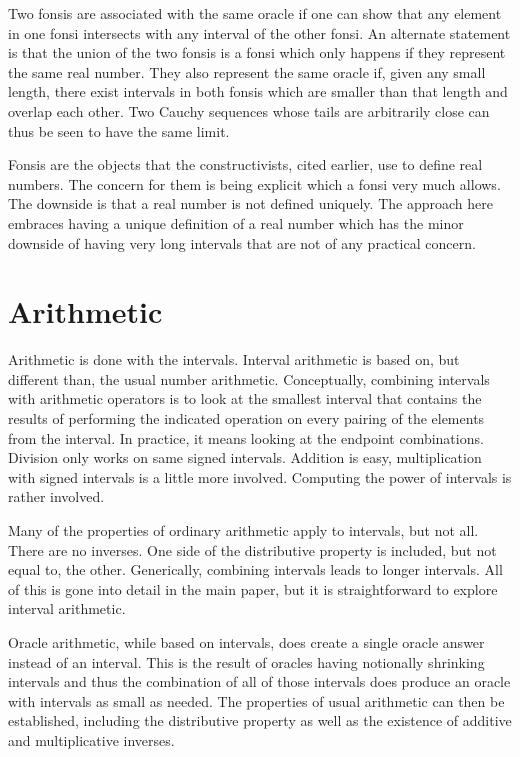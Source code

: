 \documentclass[12pt]{article}
\begin{document}
Two fonsis are associated with the same oracle if one can show that any element in one fonsi intersects with any interval of the other fonsi. An alternate statement is that the union of the two fonsis is a fonsi which only happens if they represent the same real number. They also represent the same oracle if, given any small length, there exist intervals in both fonsis which are smaller than that length and overlap each other. Two Cauchy sequences whose tails are arbitrarily close can thus be seen to have the same limit. 

Fonsis are the objects that the constructivists, cited earlier, use to define real numbers. The concern for them is being explicit which a fonsi very much allows. The downside is that a real number is not defined uniquely. The approach here embraces having a unique definition of a real number which has the minor downside of having very long intervals that are not of any practical concern. 

\section{Arithmetic}

Arithmetic is done with the intervals. Interval arithmetic is based on, but different than, the usual number arithmetic. Conceptually, combining intervals with arithmetic operators is to look at the smallest interval that contains the results of performing the indicated operation on every pairing of the elements from the interval. In practice, it means looking at the endpoint combinations. Division only works on same signed intervals. Addition is easy, multiplication with signed intervals is a little more involved. Computing the power of intervals is rather involved. 


Many of the properties of ordinary arithmetic apply to intervals, but not all. There are no inverses. One side of the distributive property is included, but not equal to, the other. Generically, combining intervals leads to longer intervals. All of this is gone into detail in the main paper, but it is straightforward to explore interval arithmetic. 

Oracle arithmetic, while based on intervals, does create a single oracle answer instead of an interval. This is the result of oracles having notionally shrinking intervals and thus the combination of all of those intervals does produce an oracle with intervals as small as needed. The properties of usual arithmetic can then be established, including the distributive property as well as the existence of additive and multiplicative inverses.   
\end{document}

